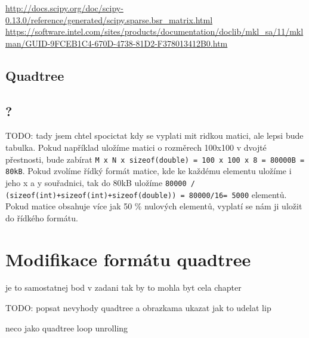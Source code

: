 \url{http://docs.scipy.org/doc/scipy-0.13.0/reference/generated/scipy.sparse.bsr_matrix.html}
\url{https://software.intel.com/sites/products/documentation/doclib/mkl_sa/11/mklman/GUID-9FCEB1C4-670D-4738-81D2-F378013412B0.htm}



\section{Quadtree}

\section{?}

TODO: tady jsem chtel spocictat kdy  se vyplati mit ridkou matici, ale lepsi bude tabulka. Pokud například uložíme matici o rozměrech 100x100 v dvojté přestnosti, bude zabírat \texttt{M x N x sizeof(double) = 100 x 100 x 8 = 80000B = 80kB}. Pokud zvolíme řídký formát matice, kde ke každému elementu uložíme i jeho x a y souřadnici, tak do 80kB uložíme \texttt{80000 / (sizeof(int)+sizeof(int)+sizeof(double)) = 80000/16= 5000} elementů. Pokud matice obsahuje více jak 50  \% nulových elementů, vyplatí se nám ji uložit do řídkého formátu.


\chapter{Modifikace formátu quadtree}

je to samostatnej bod v zadani tak by to mohla byt cela chapter

TODO: popsat nevyhody quadtree a obrazkama ukazat jak to udelat lip

neco jako quadtree loop unrolling
